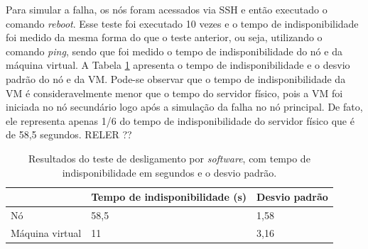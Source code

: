 Para simular a falha, os nós foram acessados via \ac{SSH} e então executado o comando \textit{reboot}. Esse teste foi executado 10 vezes e o 
tempo de indisponibilidade foi medido da mesma forma do que o teste anterior, ou seja, utilizando o comando \textit{ping}, sendo que foi medido 
o tempo de indisponibilidade do nó e da máquina virtual. A Tabela \ref{tab:teste2resultados} apresenta o tempo de indisponibilidade e o 
desvio padrão do nó e da \ac{VM}. Pode-se observar que o tempo de indisponibilidade da \ac{VM} é consideravelmente menor que o tempo do 
servidor físico, pois a \ac{VM} foi iniciada no nó secundário logo após a simulação da falha no nó principal. 
De fato, ele representa apenas 1/6 do tempo de indisponibilidade do servidor físico que é de 58,5 segundos. 
RELER ??



\begin{table}[h!]
\caption{Resultados do teste de desligamento por \textit{software}, com tempo de indisponibilidade em segundos e o desvio padrão.}
\small
\label{tab:teste2resultados}
\begin{center}
\begin{tabular}{|l|l|l|}\hline
 & \textbf{Tempo de indisponibilidade (s)} & \textbf{Desvio padrão} \\\hline
Nó & 58,5 & 1,58 \\\hline
Máquina virtual & 11 & 3,16 \\\hline
\end{tabular}
\end{center}
\end{table}

